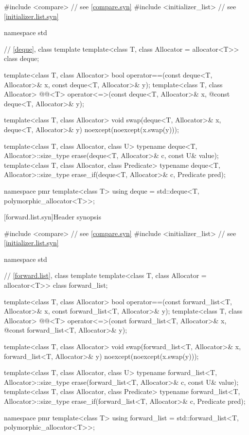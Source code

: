 %
\begin{codeblock}
#include <compare>              // see \ref{compare.syn}
#include <initializer_list>     // see \ref{initializer.list.syn}

namespace std {
  // \ref{deque}, class template 
  template<class T, class Allocator = allocator<T>> class deque;

  template<class T, class Allocator>
    bool operator==(const deque<T, Allocator>& x, const deque<T, Allocator>& y);
  template<class T, class Allocator>
    @@<T> operator<=>(const deque<T, Allocator>& x,
    @\itcorr@                                      const deque<T, Allocator>& y);

  template<class T, class Allocator>
    void swap(deque<T, Allocator>& x, deque<T, Allocator>& y)
      noexcept(noexcept(x.swap(y)));

  template<class T, class Allocator, class U>
    typename deque<T, Allocator>::size_type
      erase(deque<T, Allocator>& c, const U& value);
  template<class T, class Allocator, class Predicate>
    typename deque<T, Allocator>::size_type
      erase_if(deque<T, Allocator>& c, Predicate pred);

  namespace pmr {
    template<class T>
      using deque = std::deque<T, polymorphic_allocator<T>>;
  }
}
\end{codeblock}

[forward.list.syn]{Header  synopsis}

%
\begin{codeblock}
#include <compare>              // see \ref{compare.syn}
#include <initializer_list>     // see \ref{initializer.list.syn}

namespace std {
  // \ref{forward.list}, class template 
  template<class T, class Allocator = allocator<T>> class forward_list;

  template<class T, class Allocator>
    bool operator==(const forward_list<T, Allocator>& x, const forward_list<T, Allocator>& y);
  template<class T, class Allocator>
    @@<T> operator<=>(const forward_list<T, Allocator>& x,
    @\itcorr@                                      const forward_list<T, Allocator>& y);

  template<class T, class Allocator>
    void swap(forward_list<T, Allocator>& x, forward_list<T, Allocator>& y)
      noexcept(noexcept(x.swap(y)));

  template<class T, class Allocator, class U>
    typename forward_list<T, Allocator>::size_type
      erase(forward_list<T, Allocator>& c, const U& value);
  template<class T, class Allocator, class Predicate>
    typename forward_list<T, Allocator>::size_type
      erase_if(forward_list<T, Allocator>& c, Predicate pred);

  namespace pmr {
    template<class T>
      using forward_list = std::forward_list<T, polymorphic_allocator<T>>;
  }
}
\end{codeblock}

